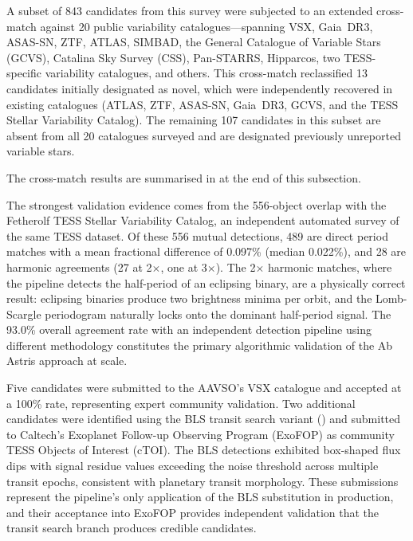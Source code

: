 \documentclass[11pt,a4paper]{article}
\begin{document}
A subset of 843 candidates from this survey were subjected to an extended cross-match against 20 public variability catalogues---spanning VSX, Gaia~DR3, ASAS-SN, ZTF, ATLAS, SIMBAD, the General Catalogue of Variable Stars (GCVS), Catalina Sky Survey (CSS), Pan-STARRS, Hipparcos, two TESS-specific variability catalogues, and others. This cross-match reclassified 13 candidates initially designated as novel, which were independently recovered in existing catalogues (ATLAS, ZTF, ASAS-SN, Gaia~DR3, GCVS, and the TESS Stellar Variability Catalog). The remaining 107 candidates in this subset are absent from all 20 catalogues surveyed and are designated previously unreported variable stars.

The cross-match results are summarised in  at the end of this subsection.

The strongest validation evidence comes from the 556-object overlap with the Fetherolf TESS Stellar Variability Catalog, an independent automated survey of the same TESS dataset. Of these 556 mutual detections, 489 are direct period matches with a mean fractional difference of 0.097\% (median 0.022\%), and 28 are harmonic agreements (27 at 2$\times$, one at 3$\times$). The 2$\times$ harmonic matches, where the pipeline detects the half-period of an eclipsing binary, are a physically correct result: eclipsing binaries produce two brightness minima per orbit, and the Lomb-Scargle periodogram naturally locks onto the dominant half-period signal. The 93.0\% overall agreement rate with an independent detection pipeline using different methodology constitutes the primary algorithmic validation of the Ab Astris approach at scale.

Five candidates were submitted to the AAVSO's VSX catalogue and accepted at a 100\% rate, representing expert community validation. Two additional candidates were identified using the BLS transit search variant () and submitted to Caltech's Exoplanet Follow-up Observing Program (ExoFOP) as community TESS Objects of Interest (cTOI). The BLS detections exhibited box-shaped flux dips with signal residue values exceeding the noise threshold across multiple transit epochs, consistent with planetary transit morphology. These submissions represent the pipeline's only application of the BLS substitution in production, and their acceptance into ExoFOP provides independent validation that the transit search branch produces credible candidates.
\end{document}
